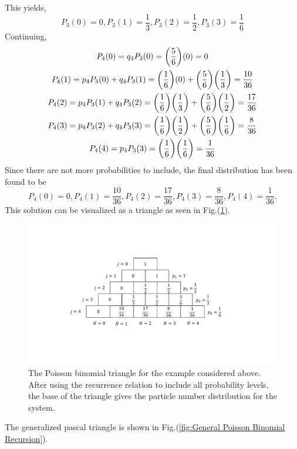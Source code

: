 This yields,
\begin{equation*}
    P_3(0)=0, P_3(1)=\frac{1}{3}, P_3(2)=\frac{1}{2}, P_3(3)=\frac{1}{6}
\end{equation*}
Continuing,
\begin{gather*}
    P_4(0)=q_4 P_3(0)=\qty(\frac{5}{6})(0)=0\\
    P_4(1)=p_4 P_{3}(0)+q_4 P_{3}(1)=\qty(\frac{1}{6})(0)+\qty(\frac{5}{6})\qty(\frac{1}{3})=\frac{10}{36}\\
    P_4(2)=p_4 P_{3}(1)+q_4 P_{3}(2)=\qty(\frac{1}{6})\qty(\frac{1}{3})+\qty(\frac{5}{6})\qty(\frac{1}{2})=\frac{17}{36}\\
    P_4(3)=p_4 P_{3}(2)+q_4 P_{3}(3)=\qty(\frac{1}{6})\qty(\frac{1}{2})+\qty(\frac{5}{6})\qty(\frac{1}{6})=\frac{8}{36}\\
    P_4(4)=p_4 P_{3}(3)=\qty(\frac{1}{6})\qty(\frac{1}{6})=\frac{1}{36}
\end{gather*}
Since there are not more probabilities to include, the final distribution has been found to be
\begin{equation*}
    P_4(0)=0, P_4(1)=\frac{10}{36}, P_4(2)=\frac{17}{36}, P_4(3)=\frac{8}{36}, P_4(4)=\frac{1}{36}.
\end{equation*}
This solution can be visualized as a triangle as seen in Fig.\@ (\ref{fig:Poisson Binomial Triangle}). 
\begin{figure}[H]
    \centering
    \includegraphics[scale=0.55]{figures/pdf/PBTriangle.pdf}
    \caption{The Poisson binomial triangle for the example considered above. After using the recurrence relation to include all probability levels, the base of the triangle gives the particle number distribution for the system.}
    \label{fig:Poisson Binomial Triangle}
\end{figure}
The generalized pascal triangle is shown in Fig.\@ (\ref{fig:General Poisson Binomial Recursion}).
